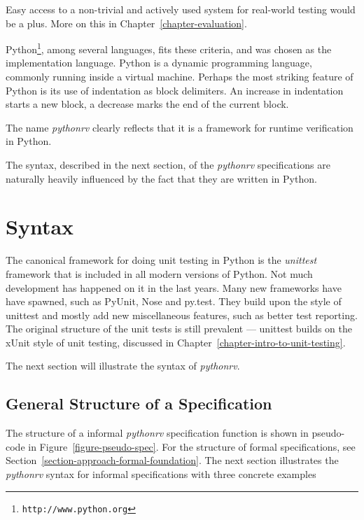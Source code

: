 \documentclass[a4paper,11pt]{kth-mag}
\begin{document}
Easy access to a non-trivial and actively used system for real-world testing
would be a plus. More on this in Chapter~\ref{chapter-evaluation}.

Python\footnote{\texttt{http://www.python.org}}, among several languages, fits
these criteria, and was chosen as the implementation language. Python is a
dynamic programming language, commonly running inside a virtual machine.
Perhaps the most striking feature of Python is its use of indentation as block
delimiters. An increase in indentation starts a new block, a decrease marks the
end of the current block.

The name \textit{pythonrv} clearly reflects that it is a framework for runtime
verification in Python.

The syntax, described in the next section, of the \textit{pythonrv}
specifications are naturally heavily influenced by the fact that they are
written in Python.


\section{Syntax} \label{section-approach-syntax}

The canonical framework for doing unit testing in Python is the
\textit{unittest} framework that is included in all modern versions of Python.
Not much development has happened on it in the last years. Many new frameworks
have have spawned, such as PyUnit, Nose and py.test. They build upon the style
of unittest and mostly add new miscellaneous features, such as better test
reporting. The original structure of the unit tests is still prevalent ---
unittest builds on the xUnit style of unit testing, discussed in
Chapter~\ref{chapter-intro-to-unit-testing}.

The next section will illustrate the syntax of \textit{pythonrv}.

\subsection{General Structure of a Specification}

The structure of a informal \textit{pythonrv} specification function is shown
in pseudo-code in Figure~\ref{figure-pseudo-spec}. For the structure of formal
specifications, see Section~\ref{section-approach-formal-foundation}. The next
section illustrates the \textit{pythonrv} syntax for informal specifications
with three concrete examples
\end{document}
